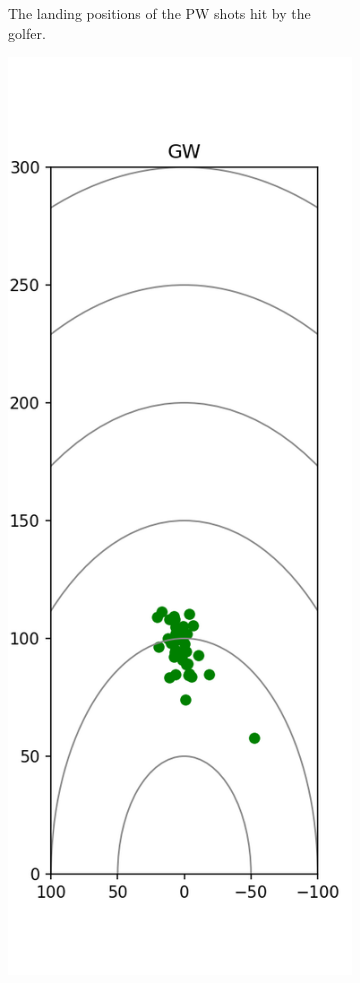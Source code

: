 \documentclass{kththesis}
\begin{document}
\begin{figure}
\begin{subfigure}{0.4\textwidth}
    \caption{The landing positions of the PW shots hit by the golfer.}
    \label{fig:PW_shots}
    \end{subfigure}
    \begin{subfigure}{0.4\textwidth}
    \centering
    \includegraphics[height=0.4\textheight]{Shots/GW_shots.png} 

\end{subfigure}
\end{figure}
\end{document}
